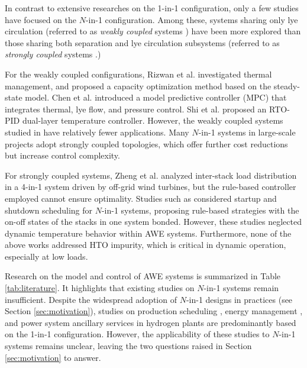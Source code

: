 \documentclass[review,3p,10pt]{elsarticle}
\begin{document}
In contrast to extensive researches on the 1-in-1 configuration, only a few studies have focused on the $N$-in-1 configuration. Among these, systems sharing only lye circulation (referred to as \emph{weakly coupled} systems \cite{chen2024enhancing}) have been more explored than those sharing both separation and lye circulation subsystems (referred to as \emph{strongly coupled} systems \cite{chen2024enhancing}.)

For the weakly coupled configurations, Rizwan et al. \cite{rizwan2021design} investigated thermal management, and proposed a capacity optimization method based on the steady-state model. Chen et al. \cite{chen2024enhancing} introduced a model predictive controller (MPC) that integrates thermal, lye flow, and pressure control. Shi et al. \cite{shi2023plant} proposed an RTO-PID dual-layer temperature controller. %
However, the weakly coupled systems studied in \cite{rizwan2021design,chen2024enhancing,shi2023plant} have relatively fewer applications. 
Many $N$-in-1 systems in large-scale projects \cite{meng2024advantages,zhangalkaline,zhai2024review} adopt strongly coupled topologies, which offer further cost reductions but increase control complexity.

For strongly coupled systems, Zheng et al. \cite{zheng2022optimal} analyzed inter-stack load distribution in a 4-in-1 system driven by off-grid wind turbines, but the rule-based controller employed cannot ensure optimality. Studies such as \cite{zhang2014wind,liang2024large,li2023exploration} considered startup and shutdown scheduling for $N$-in-1 systems, proposing rule-based strategies with the on-off states of the stacks in one system bonded. However, these studies neglected dynamic temperature behavior within AWE systems. Furthermore, none of the above works addressed HTO impurity, which is critical in dynamic operation, especially at low loads.

Research on the model and control of AWE systems is summarized in Table \ref{tab:literature}. It highlights that existing studies on $N$-in-1 systems remain insufficient. %
Despite the widespread adoption of $N$-in-1 designs in practices (see Section \ref{sec:motivation}), studies on production scheduling \cite{wang2024water,varela2021modeling,qiu2023extended}, energy management \cite{li2024two,qiu2024flexibility}, and power system ancillary services \cite{cheng2023coordinated,guan2024frequency} in hydrogen plants are predominantly based on the 1-in-1 configuration. However, the applicability of these studies to $N$-in-1 systems remains unclear, leaving the two questions raised in Section \ref{sec:motivation} to answer.
\end{document}
